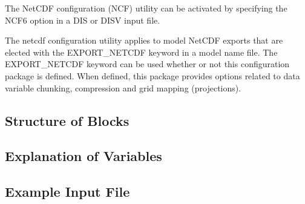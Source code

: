 The NetCDF configuration (NCF) utility can be activated by specifying the NCF6 option in a DIS or DISV input file.

The netcdf configuration utility applies to model NetCDF exports that are elected with the EXPORT\_NETCDF keyword in a model name file. The EXPORT\_NETCDF keyword can be used whether or not this configuration package is defined. When defined, this package provides options related to data variable chunking, compression and grid mapping (projections).

\subsection{Structure of Blocks}



\vspace{5mm}

\subsection{Explanation of Variables}
\begin{description}

\end{description}
\vspace{5mm}

\subsection{Example Input File}

